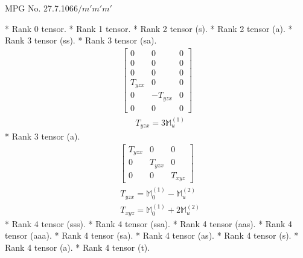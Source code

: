 \documentclass[fleqn,8pt,landscape]{jsarticle}
\begin{document}
\setcounter{MaxMatrixCols}{32}

\renewcommand{\tablename}{Table~}
\renewcommand{\figurename}{Figure~}
\begin{center}
\LARGE
MPG No. 27.7.106\quad$6/m'm'm'$
\end{center}
* Rank 0 tensor.
* Rank 1 tensor.
* Rank 2 tensor (s).
* Rank 2 tensor (a).
* Rank 3 tensor (ss).
* Rank 3 tensor (sa).
\begin{align*}
\begin{bmatrix} 0 & 0 & 0 \\ 0 & 0 & 0 \\ 0 & 0 & 0 \\ T_{yzx} & 0 & 0 \\ 0 & - T_{yzx} & 0 \\ 0 & 0 & 0 \end{bmatrix}
\end{align*}
\begin{align*}
& T_{yzx} = 3 \mathbb{M}_{u}^{(1)}
\end{align*}
* Rank 3 tensor (a).
\begin{align*}
\begin{bmatrix} T_{yzx} & 0 & 0 \\ 0 & T_{yzx} & 0 \\ 0 & 0 & T_{xyz} \end{bmatrix}
\end{align*}
\begin{align*}
& T_{yzx} = \mathbb{M}_{0}^{(1)} - \mathbb{M}_{u}^{(2)} \\
& T_{xyz} = \mathbb{M}_{0}^{(1)} + 2 \mathbb{M}_{u}^{(2)}
\end{align*}
* Rank 4 tensor (sss).
* Rank 4 tensor (ssa).
* Rank 4 tensor (aas).
* Rank 4 tensor (aaa).
* Rank 4 tensor (sa).
* Rank 4 tensor (as).
* Rank 4 tensor (s).
* Rank 4 tensor (a).
* Rank 4 tensor (t).
\end{document}
